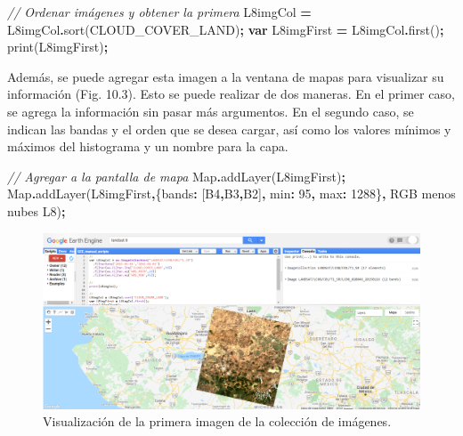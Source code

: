 \documentclass[
  12pt,
  letterpaper,
  twoside]{book}
\newenvironment{Shaded}{\begin{snugshade}}{\end{snugshade}}
\newcommand{\BuiltInTok}[1]{#1}
\newcommand{\CommentTok}[1]{\textcolor[rgb]{0.56,0.35,0.01}{\textit{#1}}}
\newcommand{\DataTypeTok}[1]{\textcolor[rgb]{0.13,0.29,0.53}{#1}}
\newcommand{\DecValTok}[1]{\textcolor[rgb]{0.00,0.00,0.81}{#1}}
\newcommand{\FunctionTok}[1]{\textcolor[rgb]{0.00,0.00,0.00}{#1}}
\newcommand{\KeywordTok}[1]{\textcolor[rgb]{0.13,0.29,0.53}{\textbf{#1}}}
\newcommand{\NormalTok}[1]{#1}
\newcommand{\OperatorTok}[1]{\textcolor[rgb]{0.81,0.36,0.00}{\textbf{#1}}}
\newcommand{\StringTok}[1]{\textcolor[rgb]{0.31,0.60,0.02}{#1}}
\begin{document}
\begin{Shaded}
\begin{Highlighting}[]
\CommentTok{// Ordenar imágenes y obtener la primera}
\NormalTok{L8imgCol }\OperatorTok{=}\NormalTok{ L8imgCol}\OperatorTok{.}\FunctionTok{sort}\NormalTok{(}\StringTok{\textquotesingle{}CLOUD\_COVER\_LAND\textquotesingle{}}\NormalTok{)}\OperatorTok{;}
\KeywordTok{var}\NormalTok{ L8imgFirst }\OperatorTok{=}\NormalTok{ L8imgCol}\OperatorTok{.}\FunctionTok{first}\NormalTok{()}\OperatorTok{;} 
\FunctionTok{print}\NormalTok{(L8imgFirst)}\OperatorTok{;}
\end{Highlighting}
\end{Shaded}

Además, se puede agregar esta imagen a la ventana de mapas para visualizar su información (Fig. 10.3). Esto se puede realizar de dos maneras. En el primer caso, se agrega la información sin pasar más argumentos. En el segundo caso, se indican las bandas y el orden que se desea cargar, así como los valores mínimos y máximos del histograma y un nombre para la capa.

\begin{Shaded}
\begin{Highlighting}[]
\CommentTok{// Agregar a la pantalla de mapa}
\BuiltInTok{Map}\OperatorTok{.}\FunctionTok{addLayer}\NormalTok{(L8imgFirst)}\OperatorTok{;}
\BuiltInTok{Map}\OperatorTok{.}\FunctionTok{addLayer}\NormalTok{(L8imgFirst}\OperatorTok{,}\NormalTok{\{}\DataTypeTok{bands}\OperatorTok{:}\NormalTok{ [}\StringTok{\textquotesingle{}B4\textquotesingle{}}\OperatorTok{,}\StringTok{\textquotesingle{}B3\textquotesingle{}}\OperatorTok{,}\StringTok{\textquotesingle{}B2\textquotesingle{}}\NormalTok{]}\OperatorTok{,} \DataTypeTok{min}\OperatorTok{:} \DecValTok{95}\OperatorTok{,} \DataTypeTok{max}\OperatorTok{:} \DecValTok{1288}\NormalTok{\}}\OperatorTok{,} 
  \StringTok{\textquotesingle{}RGB menos nubes L8\textquotesingle{}}\NormalTok{)}\OperatorTok{;}
\end{Highlighting}
\end{Shaded}

\begin{figure}[btp]

{\centering \includegraphics[width=1\linewidth]{Img/RGBIm} 

}

\caption{Visualización de la primera imagen de la colección de imágenes.}\label{fig:unnamed-chunk-161}
\end{figure}
\end{document}
